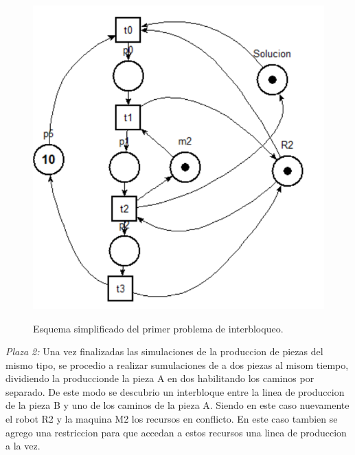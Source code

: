 \documentclass[10pt, a4paper,notitlepage]{article}
\begin{document}
\begin{figure}[H] %
	{\includegraphics[width=0.4\linewidth]{./figure/I11}}
	\caption{Esquema simplificado del primer problema de interbloqueo.}
	\label{fig:I10}
\end{figure}

\textit{Plaza 2:}
Una vez finalizadas las simulaciones de la produccion de piezas del mismo tipo, se procedio a realizar sumulaciones de a dos piezas al misom tiempo, dividiendo la produccionde la pieza A en dos habilitando los caminos por separado. De este modo se descubrio un interbloque entre la linea de produccion de la pieza B y uno de los caminos de la pieza A. Siendo en este caso nuevamente el robot R2 y la maquina M2 los recursos en conflicto. En este caso tambien se agrego una restriccion para que accedan a estos recursos una linea de produccion a la vez.
\end{document}

